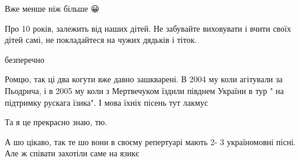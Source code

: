 \begin{itemize}
Вже менше ніж більше 😀

 
Про 10 років, залежить від наших дітей. Не забувайте виховувати і вчити своїх
дітей самі, не покладайтеся на чужих дядьків і тіток.

\begin{itemize}
 
безперечно
\end{itemize}

 

Ромцю, так ці два когути вже давно зашкварені. В 2004 му коли агітували за
Пьодрича, і в 2005 му коли з Мертвечуком їздили півднем України в тур " на
підтримку рускага їзика". І мова їхніх пісень тут лакмус

\begin{itemize}
 
Та я це прекрасно знаю, тю.

\end{itemize}

 
А шо цікаво, так те шо вони в своєму репертуарі мають 2- 3 україномовні пісні.
Але ж співати захотіли саме на язикє

\begin{itemize}
 

\end{itemize}
\end{itemize}
